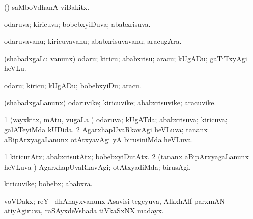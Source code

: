 {{{{{{{{{{{{\bentry 
{} 
\gl{\nA}
\expl{}
\bmng
 (\vAyx) saMboVdhanA viBakitx. 
\emng
\eentry

\bentry 
{}
\gl{\nA}
\expl{}
\bmng
\emng
\eentry

\bentry
{} 
\gl{\nA}
\expl{}
\bmng
\emng
\eentry

\bentry
{} 
\gl{\gu}
\expl{}
\bmng
 odaruva; kiricuva; bobebxyiDuva; ababxrisuva. 
\emng
\eentry

\bentry
{} 
\gl{\nA}
\expl{}
\bmng
 odaruvavanu; kiricuvavanu; ababxrisuvavanu; aracugAra. 
\emng
\eentry

\bentry
{} 
\gl{\sakirx}
\expl{}
\bmng
 (shabadxgaLu \mo vanunx) odaru; kiricu; ababxrisu; aracu; kUgADu; gaTiTxyAgi heVLu. 
\emng

\noindent 
\gl{\akirx}
\expl{}
\bmng
 odaru; kiricu; kUgADu; bobebxyiDu; aracu. 
\emng
\eentry

\bentry 
{} 
\gl{\nA}
\expl{}
\bmng
 (shabadxgaLanunx) odaruvike; kiricuvike; ababxrisuvike; aracuvike. 
\emng
\eentry

\bentry
{} 
\gl{\nA}
\expl{}
\bmng
\emng
\eentry

\bentry
{} 
\gl{\gu}
\expl{}
\bmng
\bnum
\num{1} (vayxkitx, mAtu, \mo vugaLa \vi) odaruva; kUgATda; ababxrisuva; kiricuva; galATeyiMda kUDida. 
\num{2} AgarxhapUvaRkavAgi heVLuva; tananx aBipArxyagaLanunx otAtxyavAgi yA birusiniMda heVLuva. 
\enum
\emng
\eentry

\bentry
{} 
\gl{\kirxvi}
\expl{}
\bmng
\bnum
\num{1} kiricutAtx; ababxrisutAtx; bobebxyiDutAtx. 
\num{2} (tananx aBipArxyagaLanunx heVLuva \vi) AgarxhapUvaRkavAgi; otAtxyadiMda; birusAgi. 
\enum
\emng
\eentry

\bentry 
{} 
\gl{\nA}
\expl{}
\bmng
 kiricuvike; bobebx; ababxra. 
\emng
\eentry

\bentry 
{} 
\gl{\nA}
\expl{}
\bmng
 voVDakx; reY \mo\ dhAnayxvanunx Asavisi tegeyuva, AlkxhAlf parxmAN atiyAgiruva, raSAyxdeVshada tiVkaSxNX madayx. 
\emng
\eentry

}}}}}}}}}}}}
